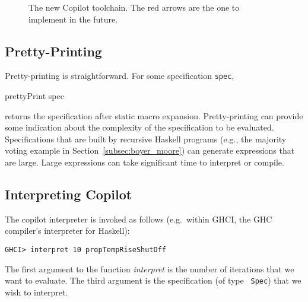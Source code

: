 \begin{figure}[ht!]
	\caption{The new Copilot toolchain. The red arrows are the one to implement in the future.}
	\label{fig:new-toolchain}
	\end{figure}

\subsection{Pretty-Printing} \label{sec:pretty-printing}
Pretty-printing is straightforward. For some specification {\tt spec},
%
\begin{code}
prettyPrint spec
\end{code}
%
\noindent
returns the specification after static macro expansion. Pretty-printing can
provide some indication about the complexity of the specification to be
evaluated. Specifications that are built by recursive Haskell programs (e.g.,
the majority voting example in Section~\ref{subsec:boyer_moore}) can generate
expressions that are large. Large expressions can take significant
time to interpret or compile.

\subsection{Interpreting Copilot}
The copilot interpreter is invoked as follows (e.g.\ within GHCI, the GHC
compiler's interpreter for Haskell):
%
\begin{lstlisting}[language = Copilot]
GHCI> interpret 10 propTempRiseShutOff
\end{lstlisting}
%
The first argument to the function \emph{interpret} is the number of iterations
that we want to evaluate. The third argument is the specification (of type {\tt
Spec}) that we wish to interpret.

